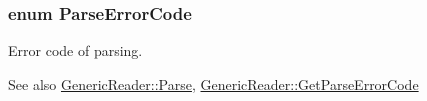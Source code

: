 \subsubsection[{\texorpdfstring{Parse\+Error\+Code}{ParseErrorCode}}]{\setlength{\rightskip}{0pt plus 5cm}enum {\bf Parse\+Error\+Code}}\hypertarget{group___r_a_p_i_d_j_s_o_n___e_r_r_o_r_s_ga8d4b32dfc45840bca189ade2bbcb6ba7}{}\label{group___r_a_p_i_d_j_s_o_n___e_r_r_o_r_s_ga8d4b32dfc45840bca189ade2bbcb6ba7}


Error code of parsing. 

\begin{DoxySeeAlso}{See also}
\hyperlink{class_generic_reader_a0c450620d14ff1824e58bb7bd9b42099}{Generic\+Reader\+::\+Parse}, \hyperlink{class_generic_reader_ac45a26246877c4daa85021ae67caa017}{Generic\+Reader\+::\+Get\+Parse\+Error\+Code} 
\end{DoxySeeAlso}
